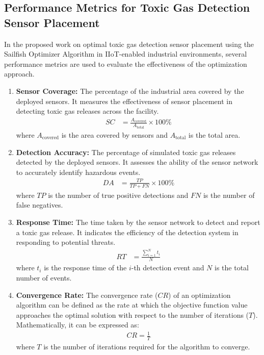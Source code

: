 \documentclass[conference]{IEEEtran}
\begin{document}
\subsection{Performance Metrics for Toxic Gas Detection Sensor Placement}
In the proposed work on optimal toxic gas detection sensor placement using the Sailfish Optimizer Algorithm in IIoT-enabled industrial environments, several performance metrics are used to evaluate the effectiveness of the optimization approach.
\begin{enumerate}
    \item \textbf{Sensor Coverage:}
    The percentage of the industrial area covered by the deployed sensors. It measures the effectiveness of sensor placement in detecting toxic gas releases across the facility.
    \begin{align*}
        SC &= \frac{A_{\text{covered}}}{A_{\text{total}}} \times 100\%
    \end{align*}
    where $A_{\text{covered}}$ is the area covered by sensors and $A_{\text{total}}$ is the total area.
    
    \item \textbf{Detection Accuracy:} The percentage of simulated toxic gas releases detected by the deployed sensors. It assesses the ability of the sensor network to accurately identify hazardous events.
    \begin{align*}
        DA &= \frac{TP}{TP + FN} \times 100\%
    \end{align*}
    where $TP$ is the number of true positive detections and $FN$ is the number of false negatives.
    
    \item \textbf{Response Time:} The time taken by the sensor network to detect and report a toxic gas release. It indicates the efficiency of the detection system in responding to potential threats.
    \begin{align*}
        RT &= \frac{\sum_{i=1}^{N} t_i}{N}
    \end{align*}
    where $t_i$ is the response time of the $i$-th detection event and $N$ is the total number of events.
    
    \item \textbf{Convergence Rate:}    
    The convergence rate ($CR$) of an optimization algorithm can be defined as the rate at which the objective function value approaches the optimal solution with respect to the number of iterations ($T$). Mathematically, it can be expressed as:
    \begin{align*}
        CR = \frac{1}{T}
    \end{align*}
    where $T$ is the number of iterations required for the algorithm to converge.
\end{enumerate}
\end{document}
